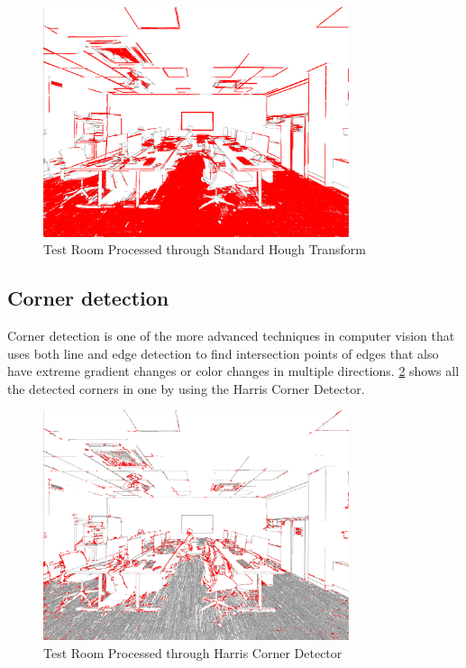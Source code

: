\begin{figure}[H]
    \centering
    \includegraphics[width=0.8\textwidth]{white_lines.png}
    \caption{Test Room Processed through Standard Hough Transform}
    \label{fig: Test Room Processed through Standard Hough Transform}
\end{figure}

\subsection{Corner detection}

Corner detection is one of the more advanced techniques in computer vision that uses both line and edge detection to find intersection points of edges that also have extreme gradient changes or color changes in multiple directions. \ref{fig: Test Room Processed through Harris Corner Detector} shows all the detected corners in one by using the Harris Corner Detector.

\begin{figure}[H]
    \centering
    \includegraphics[width=0.8\textwidth]{white_corners.png}
    \caption{Test Room Processed through Harris Corner Detector}
    \label{fig: Test Room Processed through Harris Corner Detector}
\end{figure}

